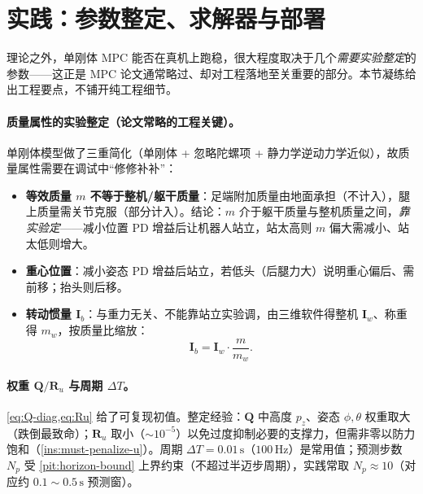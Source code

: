 \section{实践：参数整定、求解器与部署}
\label{sec:practice}

理论之外，单刚体 MPC 能否在真机上跑稳，很大程度取决于几个\emph{需要实验整定}的参数——这正是 MPC 论文通常略过、却对工程落地至关重要的部分。本节凝练给出工程要点，不铺开纯工程细节。

\paragraph{ 质量属性的实验整定（论文常略的工程关键）。}
单刚体模型做了三重简化（单刚体 + 忽略陀螺项 + 静力学逆动力学近似），故质量属性需要在调试中“修修补补”\cite{unitree2023quadruped}：
\begin{itemize}
  \item \textbf{等效质量 $m$ 不等于整机/躯干质量}：足端附加质量由地面承担（不计入），腿上质量需关节克服（部分计入）。结论：$m$ 介于躯干质量与整机质量之间，\emph{靠实验定}——减小位置 PD 增益后让机器人站立，站太高则 $m$ 偏大需减小、站太低则增大。
  \item \textbf{重心位置}：减小姿态 PD 增益后站立，若低头（后腿力大）说明重心偏后、需前移；抬头则后移。
  \item \textbf{转动惯量 $\mathbf{I}_b$}：与重力无关、不能靠站立实验调，由三维软件得整机 $\mathbf{I}_w$、称重得 $m_w$，按质量比缩放\cite{unitree2023quadruped}：
  \begin{equation}
    \mathbf{I}_b=\mathbf{I}_w\cdot\frac{m}{m_w}.
    \label{eq:inertia-scale}
  \end{equation}
\end{itemize}

\paragraph{ 权重 $\mathbf{Q}/\mathbf{R}_u$ 与周期 $\Delta T$。}
\cref{eq:Q-diag,eq:Ru} 给了可复现初值。整定经验：$\mathbf{Q}$ 中高度 $p_z$、姿态 $\phi,\theta$ 权重取大（跌倒最致命）；$\mathbf{R}_u$ 取小（$\sim10^{-5}$）以免过度抑制必要的支撑力，但需非零以防力饱和（\cref{ins:must-penalize-u}）。周期 $\Delta T=0.01\,\mathrm{s}$（$100\,\mathrm{Hz}$）是常用值；预测步数 $N_p$ 受 \cref{pit:horizon-bound} 上界约束（不超过半迈步周期），实践常取 $N_p\approx10$（对应约 $0.1\sim0.5\,\mathrm{s}$ 预测窗）。

